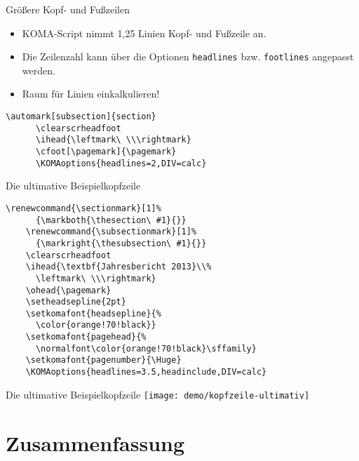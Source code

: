 \begin{Frame}[fragile]{Größere Kopf- und Fußzeilen}
  \begin{itemize}
    \item KOMA-Script nimmt 1,25 Linien Kopf- und Fußzeile an.
    \item Die Zeilenzahl kann über die Optionen \lstinline-headlines-
      bzw. \lstinline-footlines- angepasst werden.
    \item Raum für Linien einkalkulieren!
  \end{itemize}

  \xxx

  \begin{Beispiel}
    \begin{lstlisting}[gobble=6,style=block]
      \automark[subsection]{section}
      \clearscrheadfoot
      \ihead{\leftmark\ \\\rightmark}
      \cfoot[\pagemark]{\pagemark}
      \KOMAoptions{headlines=2,DIV=calc}
    \end{lstlisting}
  \end{Beispiel}
\end{Frame}

\begin{Frame}[fragile]{Die ultimative Beispielkopfzeile}
  \begin{lstlisting}[gobble=4]
    \renewcommand{\sectionmark}[1]%
      {\markboth{\thesection\ #1}{}}
    \renewcommand{\subsectionmark}[1]%
      {\markright{\thesubsection\ #1}{}}
    \clearscrheadfoot
    \ihead{\textbf{Jahresbericht 2013}\\%
      \leftmark\ \\\rightmark}
    \ohead{\pagemark}
    \setheadsepline{2pt}
    \setkomafont{headsepline}{%
      \color{orange!70!black}}
    \setkomafont{pagehead}{%
      \normalfont\color{orange!70!black}\sffamily}
    \setkomafont{pagenumber}{\Huge}
    \KOMAoptions{headlines=3.5,headinclude,DIV=calc}
  \end{lstlisting}
\end{Frame}

\begin{Frame}{Die ultimative Beispielkopfzeile}
  \texttt{[image: demo/kopfzeile-ultimativ]}
\end{Frame}

\malte

\section*{Zusammenfassung}

